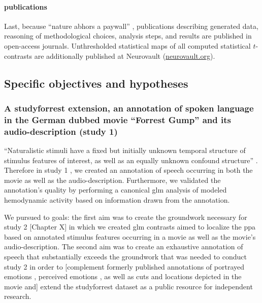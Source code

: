 \paragraph{publications}
Last, because ``nature abhors a paywall'' \citep{dupre2020nature}, publications
describing generated data, reasoning of methodological choices, analysis steps,
and results are published in open-access journals.
Unthresholded statistical maps of all computed statistical $t$-contrasts are
additionally published at Neurovault
(\href{https://neurovault.org/}{neurovault.org}).


\subsection{Specific objectives and hypotheses}


\subsubsection{A studyforrest extension, an annotation of spoken
language in the German dubbed movie ``Forrest Gump'' and its audio-description
(study 1)}



%
``Naturalistic stimuli have a fixed but initially unknown temporal structure of
stimulus features of interest, as well as an equally unknown confound
structure'' \citep{haeusler2021speechanno}.
%
Therefore in study 1 \citep{haeusler2021speechanno}, we created an annotation of
speech occurring in both the movie as well as the audio-description.
%
Furthermore, we validated the annotation's quality by performing a canonical
\ac{glm} analysis of modeled hemodynamic activity based on information drawn
from the annotation.

We pursued to goals:
the first aim was to create the groundwork necessary for study 2 [Chapter X] in
which we created \ac{glm} contrasts aimed to localize the \ac{ppa} based on
annotated stimulus features occurring in a movie as well as the movie's
audio-description.
The second aim was to create an exhaustive annotation of speech that
substantially exceeds the groundwork that was needed to conduct study 2 in order
to [complement formerly published annotations of portrayed emotions
\citep{labs2015portrayed}, perceived emotions \citep{lettieri2019emotionotopy},
as well as cuts and locations depicted in the movie \citep{haeusler2016cutanno}
and] extend the studyforrest dataset as a public resource for independent
research.

